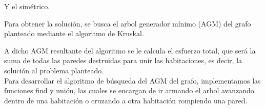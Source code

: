 Y el simétrico.

Para obtener la soluci\'on, se busca el arbol generador mínimo (AGM) del grafo planteado mediante el algoritmo de Kruskal. 

A dicho AGM resultante del algoritmo se le calcula el esfuerzo total, que será la suma de todas las paredes destruidas para unir las habitaciones, es decir, la solución al problema planteado.\\

Para desarrollar el algoritmo de b\'usqueda del AGM del grafo, implementamos las funciones find y uni\'on, las cuales se encargan de ir armando el arbol avanzando dentro de una habitación o cruzando a otra habitación rompiendo una pared.
